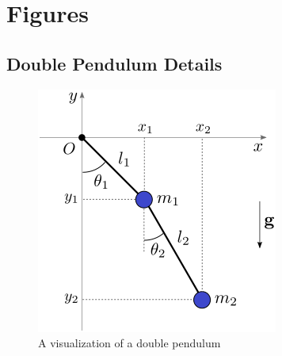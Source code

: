 \section{Figures}
\subsection{Double Pendulum Details}
\begin{figure}[H]
    \centering
    \includegraphics[scale=1]{figures/double-pendulum.png}
    \caption{A visualization of a double pendulum}
    \label{fig:1}
\end{figure}

